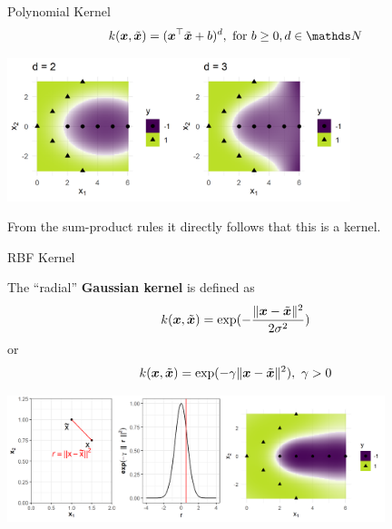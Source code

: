 \begin{vbframe}{Polynomial Kernel}
  $$k(\xv, \tilde \xv) = (\xv^\top \tilde \xv + b)^d, \text{ for } b\geq 0, d \in \N$$

\begin{center}
\includegraphics[width = 10cm ]{figure/svm_poly_kernel.png}
\end{center}

From the sum-product rules it directly follows that this is a kernel.
\end{vbframe}

\begin{vbframe}{RBF Kernel}

The \enquote{radial} \textbf{Gaussian kernel} is defined as
$$k(\bm{x}, \tilde {\bm{x}}) = \exp(-\frac{\|\bm{x} - \tilde {\bm{x}}\|^2}{2\sigma^2})$$ 
or 
$$k(\bm{x}, \tilde {\bm{x}}) = \exp(-\gamma \|\bm{x} - \tilde {\bm{x}}\|^2), ~ \gamma>0$$

\begin{center}
\includegraphics[width = 11cm ]{figure/svm_rbf_kernel.png}
\end{center}
\end{vbframe}


